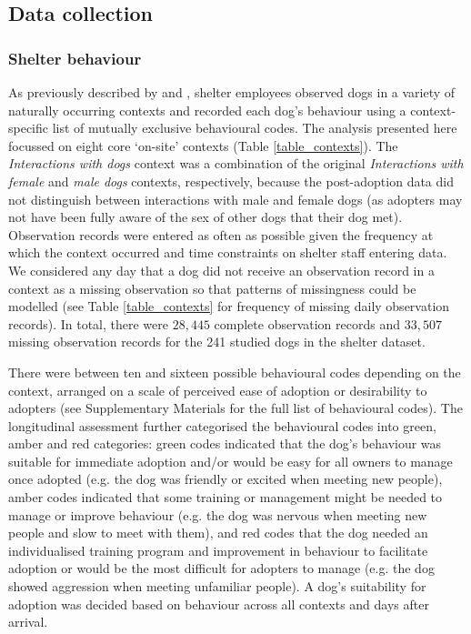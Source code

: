 \documentclass[12pt]{article}
\begin{document}
\subsection{Data collection}

\subsubsection{Shelter behaviour}
As previously described by \textcite{goold2017modelling} and \textcite{goold2017aggressiveness}, shelter employees observed dogs in a variety of naturally occurring contexts and recorded each dog's behaviour using a context-specific list of mutually exclusive behavioural codes. The analysis presented here focussed on eight core ‘on-site' contexts (Table \ref{table_contexts}). The \textit{Interactions with dogs} context was a combination of the original \textit{Interactions with female} and \textit{male dogs} contexts, respectively, because the post-adoption data did not distinguish between interactions with male and female dogs (as adopters may not have been fully aware of the sex of other dogs that their dog met). Observation records were entered as often as possible given the frequency at which the context occurred and time constraints on shelter staff entering data. We considered any day that a dog did not receive an observation record in a context as a missing observation so that patterns of missingness could be modelled (see Table \ref{table_contexts} for frequency of missing daily observation records). In total, there were $28,445$ complete observation records and $33,507$ missing observation records for the 241 studied dogs in the shelter dataset.

There were between ten and sixteen possible behavioural codes depending on the context, arranged on a scale of perceived ease of adoption or desirability to adopters (see Supplementary Materials for the full list of behavioural codes). The longitudinal assessment further categorised the behavioural codes into green, amber and red categories: green codes indicated that the dog's behaviour was suitable for immediate adoption and/or would be easy for all owners to manage once adopted (e.g. the dog was friendly or excited when meeting new people), amber codes indicated that some training or management might be needed to manage or improve behaviour (e.g. the dog was nervous when meeting new people and slow to meet with them), and red codes that the dog needed an individualised training program and improvement in behaviour to facilitate adoption or would be the most difficult for adopters to manage (e.g. the dog showed aggression when meeting unfamiliar people). A dog's suitability for adoption was decided based on behaviour across all contexts and days after arrival.
\end{document}
